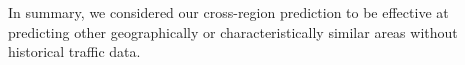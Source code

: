 
%
In summary, we considered our cross-region prediction to be effective at predicting other geographically or characteristically similar areas without historical traffic data.

